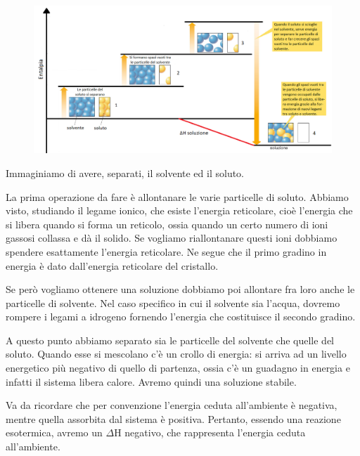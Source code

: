 \begin{figure}[htp]
    \centering
    \includegraphics[width=15cm]{immagini/processo_di_soluzione.png}
\end{figure}

Immaginiamo di avere, separati, il solvente ed il soluto.

La prima operazione da fare è allontanare le varie particelle di soluto. Abbiamo visto, studiando il legame ionico, che esiste l'energia reticolare, cioè l'energia che si libera quando si forma un reticolo, ossia quando un certo numero di ioni gassosi collassa e dà il solido. Se vogliamo riallontanare questi ioni dobbiamo spendere esattamente l'energia reticolare. Ne segue che il primo gradino in energia è dato dall'energia reticolare del cristallo.

Se però vogliamo ottenere una soluzione dobbiamo poi allontare fra loro anche le particelle di solvente. Nel caso specifico in cui il solvente sia l'acqua, dovremo rompere i legami a idrogeno fornendo l'energia che costituisce il secondo gradino.

A questo punto abbiamo separato sia le particelle del solvente che quelle del soluto. Quando esse si mescolano c'è un crollo di energia: si arriva ad un livello energetico più negativo di quello di partenza, ossia c'è un guadagno in energia e infatti il sistema libera calore. Avremo quindi una soluzione stabile.

Va da ricordare che per convenzione l'energia ceduta all'ambiente è negativa, mentre quella assorbita dal sistema è positiva. Pertanto, essendo una reazione esotermica, avremo un $\Delta$H negativo, che rappresenta l'energia ceduta all'ambiente.
